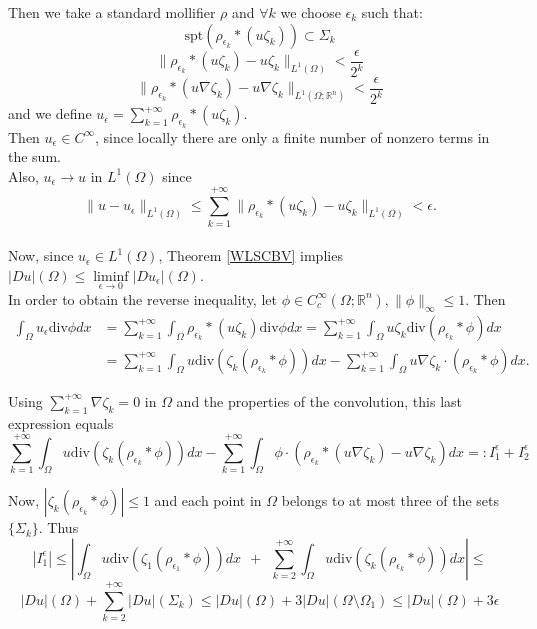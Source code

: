 Then we take a standard mollifier $\rho$ and $\forall k$  we choose $\epsilon_{k}$ such that:
\[ \mathrm{spt}(\rho_{\epsilon_{k}} \ast (u\zeta_{k})) \subset \Sigma_{k}\]
\[ \|\rho_{\epsilon_{k}} \ast (u\zeta_{k}) - u\zeta_{k}\|_{L^{1}(\Omega)} < \frac{\epsilon}{2^{k}}\]
\[ \|\rho_{\epsilon_{k}} \ast (u\nabla\zeta_{k}) - u\nabla\zeta_{k}\|_{L^{1}(\Omega; \mathbb{R}^{n})} < \frac{\epsilon}{2^{k}}\]
and we define $u_{\epsilon} = \sum_{k=1}^{+\infty} \rho_{\epsilon_{k}} \ast (u\zeta_{k})$. 
\\
Then $u_{\epsilon} \in C^{\infty}$, since locally there are only a finite number of nonzero terms in the sum.
\\
Also, $u_{\epsilon} \to u$ in $L^{1}(\Omega)$ since
\[ \|u - u_{\epsilon}\|_{L^{1}(\Omega)} \le \sum_{k = 1}^{+\infty} \|\rho_{\epsilon_{k}} \ast (u\zeta_{k}) - u\zeta_{k}\|_{L^{1}(\Omega)} < \epsilon. \]
\\
Now, since $u_{\epsilon} \in L^{1}(\Omega)$, Theorem \ref{WLSCBV} implies $|Du|(\Omega) \le \liminf\limits_{\epsilon \to 0} |Du_{\epsilon}|(\Omega)$.
\\

In order to obtain the reverse inequality, let $\phi \in C^{\infty}_{c}(\Omega; \mathbb{R}^{n}), \|\phi\|_{\infty} \le 1$. Then
\begin{align*} \int_{\Omega} u_{\epsilon} \mathrm{div}\phi dx & = \sum_{k=1}^{+\infty} \int_{\Omega} \rho_{\epsilon_{k}} \ast (u\zeta_{k}) \mathrm{div}\phi dx = \sum_{k=1}^{+\infty} \int_{\Omega} u \zeta_{k} \mathrm{div}(\rho_{\epsilon_{k}} \ast \phi) dx \\
& = \sum_{k=1}^{+\infty} \int_{\Omega} u \mathrm{div}(\zeta_{k} (\rho_{\epsilon_{k}} \ast \phi)) dx - \sum_{k=1}^{+\infty} \int_{\Omega} u \nabla \zeta_{k} \cdot (\rho_{\epsilon_{k}} \ast \phi) dx. 
\end{align*}

Using $\displaystyle \sum_{k = 1}^{+\infty} \nabla \zeta_{k} = 0$ in $\Omega$ and the properties of the convolution, this last expression equals
\[ \sum_{k=1}^{+\infty} \int_{\Omega} u \mathrm{div}(\zeta_{k} (\rho_{\epsilon_{k}} \ast \phi)) dx - \sum_{k=1}^{+\infty} \int_{\Omega} \phi \cdot (\rho_{\epsilon_{k}} \ast (u \nabla \zeta_{k}) - u \nabla \zeta_{k}) dx =: I_{1}^{\epsilon} + I_{2}^{\epsilon} \] 

Now, $|\zeta_{k}(\rho_{\epsilon_{k}} \ast \phi)| \le 1$ and each point in $\Omega$ belongs to at most three of the sets $\{\Sigma_{k}\}$. Thus
\[ |I_{1}^{\epsilon}| \le \left |\int_{\Omega} u \mathrm{div}(\zeta_{1} (\rho_{\epsilon_{1}} \ast \phi)) dx \ \ + \ \ \sum_{k=2}^{+\infty} \int_{\Omega} u \mathrm{div}(\zeta_{k} (\rho_{\epsilon_{k}} \ast \phi)) dx \right | \le \]
\[ |Du|(\Omega) + \sum_{k = 2}^{+\infty} |Du|(\Sigma_{k}) \le |Du|(\Omega) + 3|Du|(\Omega \setminus \Omega_{1}) \le |Du|(\Omega) + 3 \epsilon \]

